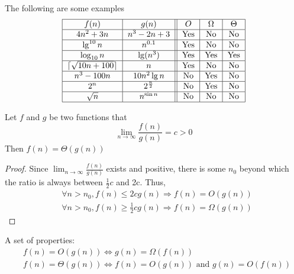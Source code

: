 					\begin{example}
						The following are some examples
						\begin{align}
							\centering
							\begin{tabular}{|c|c||c|c|c|}
								\hline
								$f(n)$ & $g(n)$ & $O$ & $\Omega$ & $\Theta$\\
								\hline
								$4n^2 + 3n$ & $n^3 - 2n + 3$ & Yes & No & No \\
								\hline
								$\lg^{10} n$ & $n^{0.1}$ & Yes & No & No \\
								\hline
								$\log_{10} n$ & $\lg(n^3)$ & Yes & Yes & Yes \\
								\hline
								$\lceil \sqrt{10n + 100} \rceil$ & $n$ & Yes & No & No \\
								\hline
								$n^3 -100n$ & $10n^2\lg n$ & No & Yes & No\\
								\hline
								$2^n$ & $2^{\frac n2}$ & No & Yes & No \\
								\hline
								$\sqrt{n}$ & $n^{\sin n}$ & No & No & No\\
								\hline
							\end{tabular}
						\end{align}
					\end{example}

					\begin{theorem}
						Let $f$ and $g$ be two functions that
						\begin{equation*}
							\lim_{n\rightarrow \infty} \frac{f(n)}{g(n)} = c > 0
						\end{equation*}
						Then $f(n) = \Theta(g(n))$
					\end{theorem}

					\begin{proof}
						Since $\lim_{n\rightarrow \infty} \frac{f(n)}{g(n)}$ exists and positive, there is some $n_0$ beyond which the ratio is always between $\frac12 c$ and 2c. Thus,
						\begin{align}
							& \forall n > n_0, f(n) \le 2cg(n) \Rightarrow f(n) = O(g(n)) \\
							& \forall n > n_0, f(n) \ge \frac12cg(n) \Rightarrow f(n) = \Omega(g(n))
						\end{align}
					\end{proof}

					A set of properties:
					\begin{align}
						& f(n) = O(g(n)) \iff g(n) = \Omega(f(n))\\
						& f(n) = \Theta(g(n)) \iff f(n) = O(g(n)) \text{ and } g(n) = O(f(n))
					\end{align}

